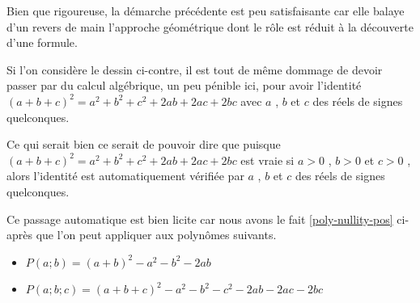 \begin{figure} 
	\begin{center}
	\end{center}
	\vspace{-1.25em}
\end{figure} 

Bien que rigoureuse, la démarche précédente est peu satisfaisante car elle balaye d'un revers de main l'approche géométrique dont le rôle est réduit à la découverte d'une formule.


\medskip

Si l'on considère le dessin ci-contre, il est tout de même dommage de devoir passer par du calcul algébrique, un peu pénible ici, pour avoir l'identité $(a + b + c)^2 = a^2 + b^2 + c^2 + 2 ab + 2 ac + 2 bc$ avec $a$ , $b$ et $c$ des réels de signes quelconques.


\medskip

Ce qui serait bien ce serait de pouvoir dire que puisque $(a + b + c)^2 = a^2 + b^2 + c^2 + 2 ab + 2 ac + 2 bc$ est vraie si $a > 0$ , $b > 0$ et $c > 0$ , alors l'identité est automatiquement vérifiée par $a$ , $b$ et $c$ des réels de signes quelconques.




\medskip

Ce passage automatique est bien licite car nous avons le fait \ref{poly-nullity-pos} ci-après que l'on peut appliquer aux polynômes suivants.
\begin{itemize}[label=\small\textbullet]
	\item $P(a ; b) = (a + b)^2 - a^2 - b^2 - 2 ab$

	\item $P(a ; b ; c) = (a + b + c)^2 - a^2 - b^2 - c^2 - 2 ab - 2 ac - 2 bc$
\end{itemize}


